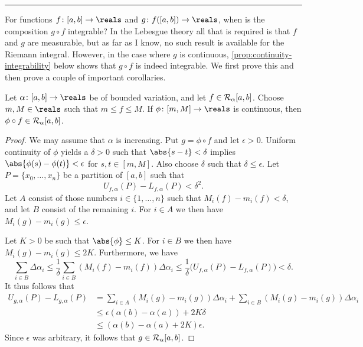 \documentclass[article, a4paper, 11pt, oneside]{memoir}
\numberwithin{equation}{chapter}
\newcommand\fleuronbreak{\fancybreak{\textcolor{linkcolor}{\adfhangingflatleafleft}}}
\begin{document}
\fleuronbreak

For functions $f \colon [a,b] \to \reals$ and $g \colon f([a,b]) \to \reals$, when is the composition $g \circ f$ integrable? In the Lebesgue theory all that is required is that $f$ and $g$ are measurable, but as far as I know, no such result is available for the Riemann integral. However, in the case where $g$ is continuous, \cref{prop:continuity-integrability} below shows that $g \circ f$ is indeed integrable. We first prove this and then prove a couple of important corollaries.

\begin{proposition}
    \label{prop:continuity-integrability}
    Let $\alpha \colon [a,b] \to \reals$ be of bounded variation, and let $f \in \integrable[\alpha]{a,b}$. Choose $m,M \in \reals$ such that $m \leq f \leq M$. If $\phi \colon [m,M] \to \reals$ is continuous, then $\phi \circ f \in \integrable[\alpha]{a,b}$.
\end{proposition}

\begin{proof}
    We may assume that $\alpha$ is increasing. Put $g = \phi \circ f$ and let $\epsilon > 0$. Uniform continuity of $\phi$ yields a $\delta > 0$ such that $\abs{s-t} < \delta$ implies $\abs{\phi(s) - \phi(t)} < \epsilon$ for $s,t \in [m,M]$. Also choose $\delta$ such that $\delta \leq \epsilon$. Let $P = \{x_0, \ldots, x_n\}$ be a partition of $[a,b]$ such that
    \begin{equation*}
        U_{f,\alpha}(P) - L_{f,\alpha}(P) < \delta^2.
    \end{equation*}
    Let $A$ consist of those numbers $i \in \{1, \ldots, n\}$ such that $M_i(f) - m_i(f) < \delta$, and let $B$ consist of the remaining $i$. For $i \in A$ we then have $M_i(g) - m_i(g) \leq \epsilon$.

    Let $K > 0$ be such that $\abs{\phi} \leq K$. For $i \in B$ we then have $M_i(g) - m_i(g) \leq 2K$. Furthermore, we have
    \begin{equation*}
        \sum_{i \in B} \Delta\alpha_i
            \leq \frac{1}{\delta} \sum_{i \in B} (M_i(f) - m_i(f)) \Delta\alpha_i
            \leq \frac{1}{\delta} \bigl( U_{f,\alpha}(P) - L_{f,\alpha}(P) \bigr)
            < \delta.
    \end{equation*}
    It thus follows that
    \begin{align*}
        U_{g, \alpha}(P) - L_{g, \alpha}(P)
            &= \sum_{i \in A} (M_i(g) - m_i(g)) \Delta\alpha_i
               + \sum_{i \in B} (M_i(g) - m_i(g)) \Delta\alpha_i \\
            &\leq \epsilon (\alpha(b) - \alpha(a))
               + 2K \delta \\
            &\leq (\alpha(b) - \alpha(a) + 2K) \epsilon.
    \end{align*}
    Since $\epsilon$ was arbitrary, it follows that $g \in \integrable[\alpha]{a,b}$.
\end{proof}
\end{document}
